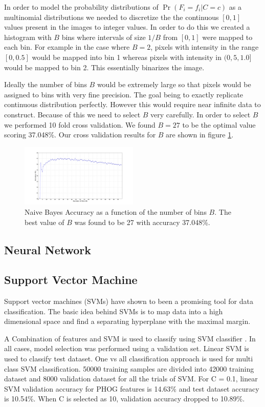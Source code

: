 \documentclass[10pt,twocolumn]{article}
\begin{document}
In order to model the probability distributions of $\Pr(F_i = f_i | C = c)$ as a multinomial distributions we needed to discretize the the continuous $[0,1]$ values present in the images to integer values. In order to do this we created a histogram with $B$ bins where intervals of size $1/B$ from $[0,1]$ were mapped to each bin. For example in the case where $B = 2$, pixels with intensity in the range $[0,0.5]$ would be mapped into bin 1 whereas pixels with intensity in $(0,5,1.0]$ would be mapped to bin 2. This essentially binarizes the image.

Ideally the number of bins $B$ would be extremely large so that pixels would be assigned to bins with very fine precision. The goal being to exactly replicate continuous distribution perfectly. However this would require near infinite data to construct. Because of this we need to select $B$ very carefully. In order to select $B$ we performed 10 fold cross validation. We found $B=27$ to be the optimal value scoring 37.048\%. Our cross validation results for $B$ are shown in figure \ref{bins}.
\begin{figure}
\includegraphics[trim=150 40 150 50,clip=true,width=0.5\textwidth]{./figure_1.png}
\caption{Naive Bayes Accuracy as a function of the number of bins $B$. The best value of $B$ was found to be 27 with accuracy 37.048\%.}
\label{bins}
\end{figure}
\subsection{Neural Network}
\subsection{Support Vector Machine}
Support vector machines (SVMs) have shown to been a promising tool for data classification. The basic idea behind SVMs is to map data into a high dimensional space and find a separating hyperplane with the maximal margin.

A Combination of features and SVM is used to classify using SVM classifier \cite {chen2006combining}. In all cases, model selection was performed using a validation set. Linear SVM is used to classify test dataset. One vs all classification approach is used for multi class SVM classification. 50000 training samples are divided into 42000 training dataset and 8000 validation dataset for all the trials of SVM. For C = 0.1, linear SVM validation accuracy for PHOG features is 14.63\% and test dataset accuracy is 10.54\%.  When C is selected as 10, validation accuracy dropped to 10.89\%.
\end{document}
